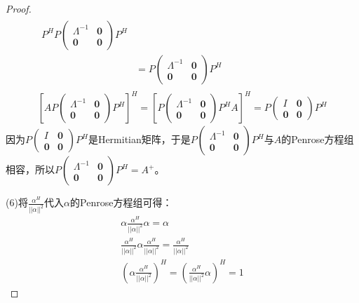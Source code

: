 \begin{proof}
\begin{gather*}
\begin{aligned}
			P^HP
			\begin{pmatrix}
				\varLambda^{-1} & \mathbf{0} \\
				\mathbf{0} & \mathbf{0}
			\end{pmatrix}
			P^H \\
			&=P
			\begin{pmatrix}
				\varLambda^{-1} & \mathbf{0} \\
				\mathbf{0} & \mathbf{0}
			\end{pmatrix}
			P^H
		\end{aligned} \\
		\left[AP
		\begin{pmatrix}
			\varLambda^{-1} & \mathbf{0} \\
			\mathbf{0} & \mathbf{0}
		\end{pmatrix}
		P^H\right]^H
		=
		\left[P
		\begin{pmatrix}
			\varLambda^{-1} & \mathbf{0} \\
			\mathbf{0} & \mathbf{0}
		\end{pmatrix}
		P^HA\right]^H
		=P
		\begin{pmatrix}
			I & \mathbf{0} \\
			\mathbf{0} & \mathbf{0}
		\end{pmatrix}
		P^H
	\end{gather*}
	因为$P
	\begin{pmatrix}
		I & \mathbf{0} \\
		\mathbf{0} & \mathbf{0}
	\end{pmatrix}
	P^H$是Hermitian矩阵，于是$P
	\begin{pmatrix}
		\varLambda^{-1} & \mathbf{0} \\
		\mathbf{0} & \mathbf{0}
	\end{pmatrix}P^H$与$A$的Penrose方程组相容，所以$P
	\begin{pmatrix}
	\varLambda^{-1} & \mathbf{0} \\
	\mathbf{0} & \mathbf{0}
	\end{pmatrix}P^H=A^+$。\par
	(6)将$\frac{\alpha^H}{||\alpha||^2}$代入$\alpha$的Penrose方程组可得：
	\begin{gather*}
		\alpha\frac{\alpha^H}{||\alpha||^2}\alpha=\alpha  \\
		\frac{\alpha^H}{||\alpha||^2}\alpha\frac{\alpha^H}{||\alpha||^2}=\frac{\alpha^H}{||\alpha||^2} \\
		\left(\alpha\frac{\alpha^H}{||\alpha||^2}\right)^H=\left(\frac{\alpha^H}{||\alpha||^2}\alpha\right)^H=1
	\end{gather*}

\end{proof}
